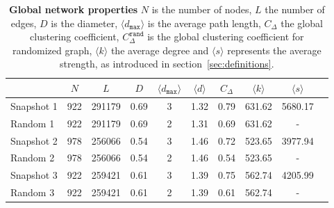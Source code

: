 \begin{table}[htb]
\centering
\caption[Global network properties]{\textbf{Global network properties} $N$ is the number of nodes, $L$ the number of edges, $D$ is the diameter, $\langle d_{\texttt{max}} \rangle$ is the average path length, $C_\Delta$ the global clustering coefficient, $C_{\Delta}^\texttt{rand}$ is the global clustering coefficient for randomized graph, $\langle k \rangle$ the average degree and $\langle s \rangle$ represents the average strength, as introduced in section~\ref{sec:definitions}.}
\label{tab:stats}
\vspace*{5mm}
\begin{tabularx}{\textwidth}{lccccccccc}
\toprule
{} &  $N$ &   $L$ &  $D$ &  $\langle d_{\texttt{max}} \rangle$ &  $\langle d \rangle$ &   $C_\Delta$ & $\langle k \rangle$ &  $\langle s \rangle$ \\
\midrule
Snapshot 1 & 922 & 291179 & 0.69 & 3 & 1.32 &  0.79 & 631.62 & 5680.17 \\
Random 1  & 922 & 291179 & 0.69 & 2 & 1.31 &  0.69 & 631.62 & - \\ \midrule
Snapshot 2 & 978 & 256066 & 0.54 & 3 & 1.46 &  0.72 & 523.65 & 3977.94 \\
Random 2  & 978 & 256066 & 0.54 & 2 & 1.46 &  0.54 & 523.65 & - \\ \midrule
Snapshot 3 & 922 & 259421 & 0.61 & 3 & 1.39 &  0.75 & 562.74 & 4205.99 \\
Random 3  & 922 & 259421 & 0.61 & 2 & 1.39 &  0.61 & 562.74 & - \\
\bottomrule
\end{tabularx}
\end{table}
